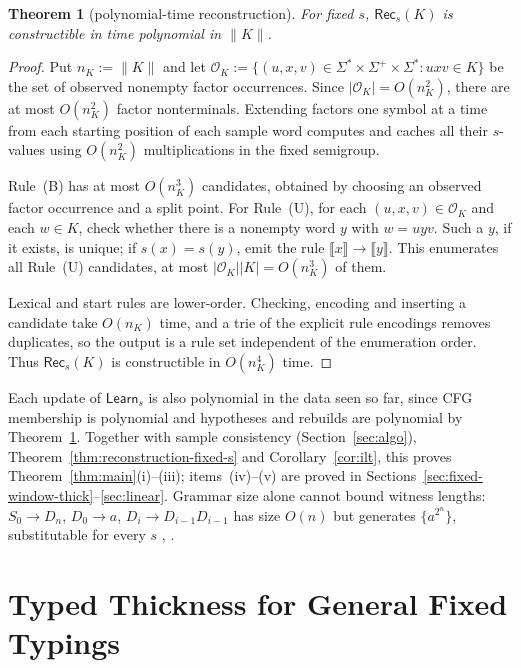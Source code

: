 \documentclass[11pt,a4paper]{article}
\newcommand{\NT}[1]{\llbracket #1\rrbracket}
\newtheorem{theorem}{Theorem}[section]
\theoremstyle{remark}
\theoremstyle{plain}
\begin{document}
\begin{theorem}[polynomial-time reconstruction]\label{thm:poly-build}
For fixed $s$, $\mathsf{Rec}_s(K)$ is constructible in time polynomial in
$\|K\|$.
\end{theorem}
\begin{proof}
Put $n_K:=\|K\|$ and let
$\mathcal O_K:=
\{(u,x,v)\in\Sigma^*\times\Sigma^+\times\Sigma^*
:uxv\in K\}$
be the set of observed nonempty factor occurrences.
Since $|\mathcal O_K|=O(n_K^2)$, there are at most
$O(n_K^2)$ factor nonterminals.
Extending factors one symbol at a time from each starting
position of each sample word computes and caches all their
$s$-values using $O(n_K^2)$ multiplications in the fixed semigroup.

Rule~\textup{(B)} has at most $O(n_K^3)$ candidates,
obtained by choosing an observed factor occurrence and a split point.
For Rule~\textup{(U)}, for each $(u,x,v)\in\mathcal O_K$
and each $w\in K$, check whether there is a nonempty word $y$
with $w=uyv$. Such a $y$, if it exists, is unique;
if $s(x)=s(y)$, emit the rule $\NT{x}\to\NT{y}$.
This enumerates all Rule~\textup{(U)} candidates, at most
$|\mathcal O_K||K|=O(n_K^3)$ of them.

Lexical and start rules are lower-order.  Checking, encoding and
inserting a candidate take $O(n_K)$ time, and a trie of the explicit rule
encodings removes duplicates, so the output is a rule set independent of
the enumeration order.  Thus $\mathsf{Rec}_s(K)$ is constructible in
$O(n_K^4)$ time.
\end{proof}

Each update of $\mathsf{Learn}_s$ is also polynomial in the data seen so far,
since CFG membership is polynomial and hypotheses and rebuilds are
polynomial by Theorem~\ref{thm:poly-build}.
Together with sample consistency (Section~\ref{sec:algo}),
Theorem~\ref{thm:reconstruction-fixed-s} and Corollary~\ref{cor:ilt}, this
proves Theorem~\ref{thm:main}(i)--(iii); items~(iv)--(v) are proved in
Sections~\ref{sec:fixed-window-thick}--\ref{sec:linear}.  Grammar size alone
cannot bound witness lengths: $S_0\to D_n$, $D_0\to a$,
$D_i\to D_{i-1}D_{i-1}$ has size $O(n)$ but generates
$\{a^{2^n}\}$, substitutable for every $s$
\cite[Example~2]{clark-eyraud2007},
\cite[Example~2.3]{eyraud-heinz-yoshinaka2016}.

\section{Typed Thickness for General Fixed Typings}
\label{sec:typed-thickness}
\end{document}
